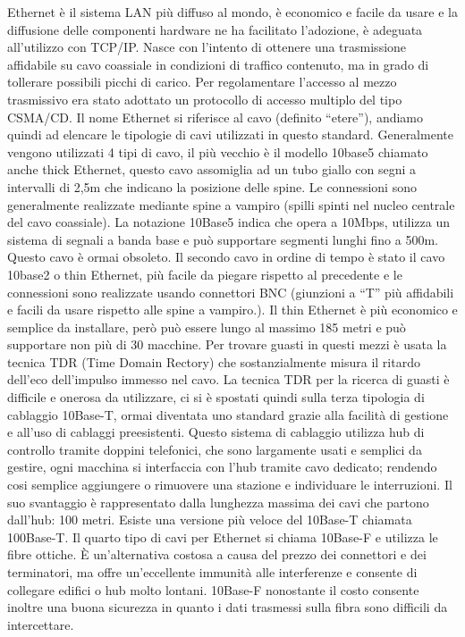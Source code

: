 Ethernet è il sistema LAN più diffuso al mondo, è economico e facile da usare e la diffusione delle componenti hardware ne ha facilitato l’adozione, è adeguata all’utilizzo con TCP/IP.
Nasce con l’intento di ottenere una trasmissione affidabile su cavo coassiale in condizioni di traffico contenuto, ma in grado di tollerare possibili picchi di carico. Per regolamentare l’accesso al mezzo trasmissivo era stato adottato un protocollo di accesso multiplo del tipo CSMA/CD.
Il nome Ethernet si riferisce al cavo (definito “etere”), andiamo quindi ad elencare le tipologie di cavi utilizzati in questo standard.
Generalmente vengono utilizzati 4 tipi di cavo, il più vecchio è il modello 10base5 chiamato anche thick Ethernet, questo cavo assomiglia ad un tubo giallo con segni a intervalli di 2,5m che indicano la posizione delle spine.
Le connessioni sono generalmente realizzate mediante spine a vampiro (spilli spinti nel nucleo centrale del cavo coassiale). 
La notazione 10Base5 indica che opera a 10Mbps, utilizza un sistema di segnali a banda base e può supportare segmenti lunghi fino a 500m. Questo cavo è ormai obsoleto.
Il secondo cavo in ordine di tempo è stato il cavo 10base2 o thin Ethernet, più facile da piegare rispetto al precedente e le connessioni sono realizzate usando connettori BNC (giunzioni a “T” più affidabili e facili da usare rispetto alle spine a vampiro.). Il thin Ethernet è più economico e semplice da installare, però può essere lungo al massimo 185 metri e può supportare non più di 30 macchine.
Per trovare guasti in questi mezzi è usata la tecnica TDR (Time Domain Rectory) che sostanzialmente misura il ritardo dell'eco dell'impulso immesso nel cavo.
La tecnica TDR per la ricerca di guasti è difficile e onerosa da utilizzare, ci si è spostati quindi sulla terza tipologia di cablaggio 10Base-T, ormai diventata uno standard grazie alla facilità di gestione e all’uso di cablaggi preesistenti.
Questo sistema di cablaggio utilizza hub di controllo tramite doppini telefonici, che sono largamente usati e semplici da gestire, ogni macchina si interfaccia con l’hub tramite cavo dedicato; rendendo cosi semplice aggiungere o rimuovere una stazione e individuare le interruzioni. Il suo svantaggio è rappresentato dalla lunghezza massima dei cavi che partono dall’hub: 100 metri. Esiste una versione più veloce del 10Base-T chiamata 100Base-T.
Il quarto tipo di cavi per Ethernet si chiama 10Base-F e utilizza le fibre ottiche. È un’alternativa costosa a causa del prezzo dei connettori e dei terminatori, ma offre un’eccellente immunità alle interferenze e consente di collegare edifici o hub molto lontani. 10Base-F nonostante il costo consente inoltre una buona sicurezza in quanto i dati trasmessi sulla fibra sono difficili da intercettare.
 

